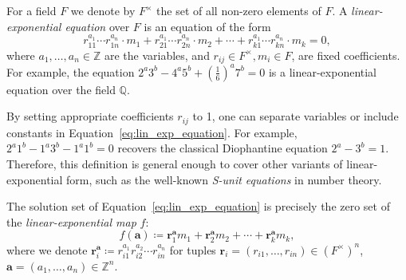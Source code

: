 \documentclass[letterpaper, 11pt, thm-restate]{article}
\numberwithin{equation}{section}
\newcommand{\Z}{\mathbb{Z}}
\newcommand{\Q}{\mathbb{Q}}
\newcommand{\ba}{\boldsymbol{a}}
\newcommand{\br}{\boldsymbol{r}}
\newcommand{\gen}[1]{\langle {#1} \rangle}
\theoremstyle{definition}
\theoremstyle{definition}
\theoremstyle{definition}
\begin{document}
For a field $F$ we denote by $F^{\times}$ the set of all non-zero elements of $F$.
A \emph{linear-exponential equation} over $F$ is an equation of the form
\begin{equation}\label{eq:lin_exp_equation}
r_{11}^{a_1} \cdots r_{1n}^{a_n} \cdot m_1 + r_{21}^{a_1} \cdots r_{2n}^{a_n} \cdot m_2 + \cdots + r_{k1}^{a_1} \cdots r_{kn}^{a_n} \cdot m_k = 0,
\end{equation}
where $a_1, \ldots, a_n \in \Z$ are the variables, and $r_{ij} \in F^{\times}, m_i \in F$, are fixed coefficients.
For example, the equation $2^{a} 3^{b} - 4^{a} 5^{b} + \left(\frac{1}{6}\right)^{a} 7^{b} = 0$ is a linear-exponential equation over the field $\Q$.

By setting appropriate coefficients $r_{ij}$ to 1, one can separate variables or include constants in Equation~\eqref{eq:lin_exp_equation}.
For example, $2^a 1^b - 1^a 3^b - 1^a 1^b = 0$ recovers the classical Diophantine equation $2^a - 3^b = 1$.
Therefore, this definition is general enough to cover other variants of linear-exponential form, such as the well-known \emph{S-unit equations} in number theory.


The solution set of Equation~\eqref{eq:lin_exp_equation} is precisely the zero set of the \emph{linear-exponential map} $f$:
\begin{equation}\label{eq:lin_exp_map}
f(\ba) \coloneqq \br_1^{\ba} m_1 + \br_2^{\ba} m_2 + \cdots + \br_k^{\ba} m_k,
\end{equation}
where we denote $\br_i^{\ba} \coloneqq r_{i1}^{a_1} r_{i2}^{a_2} \cdots r_{in}^{a_n}$ for tuples $\br_i = (r_{i1}, \ldots, r_{in})\in (F^{\times})^n$, $\ba = (a_1, \ldots, a_n)\in\Z^n$.
\end{document}
